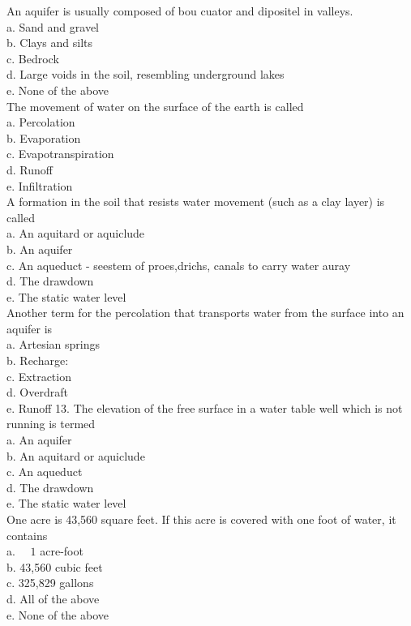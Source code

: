 An aquifer is usually composed of bou cuator and dipositel in valleys.\\
a. Sand and gravel\\
b. Clays and silts\\
c. Bedrock\\
d. Large voids in the soil, resembling underground lakes\\
e. None of the above\\

The movement of water on the surface of the earth is called\\
a. Percolation\\
b. Evaporation\\
c. Evapotranspiration\\
d. Runoff\\
e. Infiltration\\

A formation in the soil that resists water movement (such as a clay layer) is called\\
a. An aquitard or aquiclude\\
b. An aquifer\\
c. An aqueduct - seestem of proes,drichs, canals to carry water auray\\
d. The drawdown\\
e. The static water level\\

Another term for the percolation that transports water from the surface into an aquifer is\\
a. Artesian springs\\
b. Recharge:\\
c. Extraction\\
d. Overdraft\\
e. Runoff 13. The elevation of the free surface in a water table well which is not running is termed\\
a. An aquifer\\
b. An aquitard or aquiclude\\
c. An aqueduct\\
d. The drawdown\\
e. The static water level\\

One acre is 43,560 square feet. If this acre is covered with one foot of water, it contains\\
a. $\quad 1$ acre-foot\\
b. 43,560 cubic feet\\
c. 325,829 gallons\\
d. All of the above\\
e. None of the above\\

